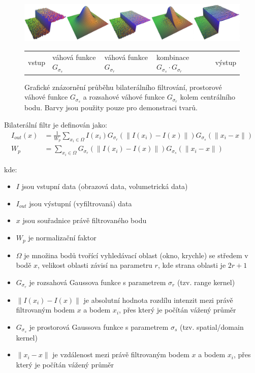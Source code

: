 \begin{figure} [H]
    \centering
    \label{fig:bl:desc}
    \includegraphics[width=1\textwidth]{figures/bf-dsc.png}
    \begin{tabularx}{1\textwidth}{
        >{\centering}X
        >{\centering}X
        >{\centering}X
        >{\centering}X
        >{\centering}X } 
        vstup & váhová funkce $G_{\sigma_s}$ & váhová funkce $G_{\sigma_r}$ & kombinace $G_{\sigma_s} \cdot G_{\sigma_r}$ & výstup
    \end{tabularx}
    \caption{Grafické znázornění průběhu bilaterálního filtrování, prostorové váhové funkce $G_{\sigma_s}$ a rozsahové váhové funkce $G_{\sigma_r}$ kolem centrálního bodu. Barvy jsou použity pouze pro demonstraci tvarů. }
\end{figure}

Bilaterální filtr je definován jako:
\begin{align}
    \label{eq:bf}
    I_{out}(x) &= \frac{1}{W_p}\displaystyle\sum_{x_i\in\Omega}I(x_i)G_{\sigma_r}(\|I(x_i)-I(x)\|)G_{\sigma_s}(\|x_i-x\|) \\
    W_p &= \displaystyle\sum_{x_i\in\Omega}G_{\sigma_r}(\|I(x_i)-I(x)\|)G_{\sigma_s}(\|x_i-x\|)
\end{align}

kde:
\begin{itemize}
    \item $I$ jsou vstupní data (obrazová data, volumetrická data)
    \item $I_{out}$ jsou výstupní (vyfiltrovaná) data
    \item $x$ jsou souřadnice právě filtrovaného bodu
    \item $W_p$ je normalizační faktor
    \item $\Omega$ je množina bodů tvořící vyhledávací oblast (okno, krychle) se středem v bodě $x$, velikost oblasti závisí na parametru $r$, kde strana oblasti je $2r+1$
    \item $G_{\sigma_r}$ je rozsahová Gaussova funkce s parametrem $\sigma_r$ (tzv. range kernel)
    \item $\|I(x_i)-I(x)\|$ je absolutní hodnota rozdílu intenzit mezi právě filtrovaným bodem $x$ a bodem $x_i$, přes který je počítán vážený průměr
    \item $G_{\sigma_s}$ je prostorová Gaussova funkce s parametrem $\sigma_s$ (tzv. spatial/domain kernel)
    \item $\|x_i-x\|$ je  vzdálenost mezi právě filtrovaným bodem $x$ a bodem $x_i$, přes který je počítán vážený průměr
\end{itemize}

